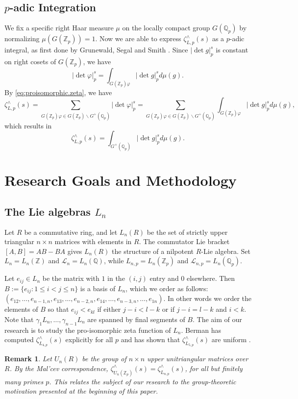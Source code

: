 \documentclass[12pt]{article}
\newtheorem{remark}[theorem]{Remark}
\begin{document}
\subsection{$p$-adic Integration}
We fix a specific right Haar measure $\mu$ on the locally compact group $G(\mathbb{Q}_{p})$ by normalizing $\mu(G(\mathbb{Z}_p))=1$. Now we are able to express $\zeta_{L,p}^{\wedge}(s)$ as a $p$-adic integral, as first done by Grunewald, Segal and Smith \cite[Proposition 4.2]{GrunewaldSegalSmith}. Since $|\det{g}|_{p}^{s}$ is constant on right cosets of $G(\mathbb{Z}_{p})$, we have \[|\det\varphi|_{p}^{s}=\displaystyle\int_{G(\mathbb{Z}_p)\varphi}{|\det{g}|_{p}^{s}}d\mu(g).\]
By \eqref{eq:proisomorphic.zeta}, we have \[\zeta_{L,p}^{\wedge}(s)=\underset{\scriptscriptstyle G(\mathbb{Z}_p)\varphi\in G(\mathbb{Z}_p)\backslash{G^{+}(\mathbb{Q}_p)}}{\sum}|\det\varphi|_{p}^{s}=\underset{\scriptscriptstyle{G(\mathbb{Z}_p)}\varphi\in G(\mathbb{Z}_p)\backslash{G^{+}(\mathbb{Q}_p)}}{\sum}\displaystyle{\int_{G(\mathbb{Z}_p)\varphi}}{|\det{g}|_{p}^{s}}d\mu(g),\]
which results in \begin{equation}
\label{eq:p-adic.integral}
\zeta_{L,p}^{\wedge}(s)=\displaystyle\int_{G^{+}(\mathbb{Q}_p)}{|\det{g}|_{p}^{s}}d\mu(g).
\end{equation}
\section{Research Goals and Methodology}
\subsection{The Lie algebras $L_{n}$}
Let $R$ be a commutative ring, and let $L_{n}(R)$ be the set of strictly upper triangular $n\times{n}$ matrices with elements in $R$. The commutator Lie bracket $[A,B]=AB-BA$ gives $L_{n}(R)$ the structure of a nilpotent $R$-Lie algebra. Set $L_{n}=L_{n}(\mathbb{Z})$ and $\mathcal{L}_{n}=L_{n}(\mathbb{Q})$, while $L_{n,p}=L_{n}(\mathbb{Z}_{p})$ and $\mathcal{L}_{n,p}=L_{n}(\mathbb{Q}_{p})$.

Let $e_{ij}\in{L_{n}}$ be the matrix with $1$ in the $(i,j)$ entry and $0$ elsewhere. Then $B:=\{e_{ij} : 1\leq{i}<{j}\leq{n}\}$ is a basis of $L_{n}$, which we order as follows: $(e_{12},\dots,e_{n-1,n},e_{13},\dots,e_{n-2,n},e_{14},\dots,e_{n-3,n},\dots,e_{1n})$. In other words we order the elements of $B$ so that $e_{ij}<e_{kl}$ if either $j-i<l-k$ or if $j-i=l-k$ and $i<k$. Note that $\gamma_{1}L_{n},\dots,\gamma_{n-1}L_{n}$ are spanned by final segments of $B$. The aim of our research is to study the pro-isomorphic zeta function of $L_{n}$. Berman has computed $\zeta_{L_{4,p}}^{\wedge}(s)$ explicitly for all $p$ \cite[\S{3.3.7}]{BermanThesis} and has shown that $\zeta_{L_{5,p}}^{\wedge}(s)$ are uniform \cite[Proposition 3.12]{BermanThesis}.
\begin{remark}
Let $U_n(R)$ be the group of $n\times{n}$ upper unitriangular matrices over $R$. By the Mal'cev correspondence, ${\zeta^\wedge_{U_{n}(\mathbb{Z}_{p})}}(s)={\zeta^\wedge_{L_{n,p}}}(s)$, for all but finitely many primes $p$. This relates the subject of our research to the group-theoretic motivation presented at the beginning of this paper.
\end{remark}
\end{document}
